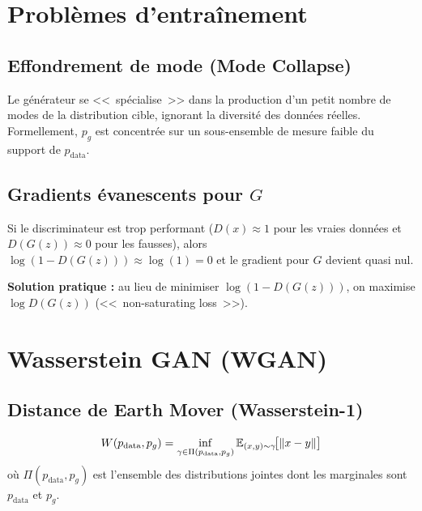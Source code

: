 \section{Probl\`emes d'entra\^inement}
\label{sec:gan-training-problems}

\subsection{Effondrement de mode (Mode Collapse)}

\begin{definition}
Le g\'en\'erateur se <<~sp\'ecialise~>> dans la production d'un petit nombre de modes de la distribution cible, ignorant la diversit\'e des donn\'ees r\'eelles. Formellement, $p_g$ est concentr\'ee sur un sous-ensemble de mesure faible du support de $p_{\text{data}}$.
\end{definition}

\subsection{Gradients \'evanescents pour $G$}

\begin{attention}
Si le discriminateur est trop performant ($D(x) \approx 1$ pour les vraies donn\'ees et $D(G(z)) \approx 0$ pour les fausses), alors $\log(1 - D(G(z))) \approx \log(1) = 0$ et le gradient pour $G$ devient quasi nul.

\textbf{Solution pratique :} au lieu de minimiser $\log(1 - D(G(z)))$, on maximise $\log D(G(z))$ (<<~non-saturating loss~>>).
\end{attention}

\section{Wasserstein GAN (WGAN)}
\label{sec:wgan}

\subsection{Distance de Earth Mover (Wasserstein-1)}

\begin{definition}
\begin{equation}
W(p_{\text{data}}, p_g) = \inf_{\gamma \in \Pi(p_{\text{data}}, p_g)} \mathbb{E}_{(x, y) \sim \gamma}\!\big[\|x - y\|\big]
\end{equation}
o\`u $\Pi(p_{\text{data}}, p_g)$ est l'ensemble des distributions jointes dont les marginales sont $p_{\text{data}}$ et $p_g$.
\end{definition}

